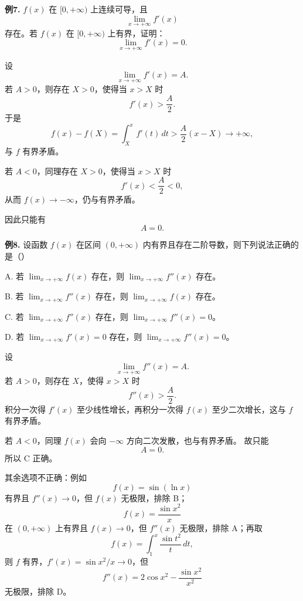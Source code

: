 \begin{problemblock}
\textbf{例7.} \(f(x)\) 在 \([0,+\infty)\) 上连续可导，且
\[
\lim_{x\to+\infty}f'(x)
\]
存在。若 \(f(x)\) 在 \([0,+\infty)\) 上有界，证明：
\[
\lim_{x\to+\infty}f'(x)=0.
\]
\end{problemblock}
\begin{solutionblock}
设
\[
\lim_{x\to+\infty}f'(x)=A.
\]
若 \(A>0\)，则存在 \(X>0\)，使得当 \(x>X\) 时
\[
f'(x)>\frac A2.
\]
于是
\[
f(x)-f(X)=\int_X^x f'(t)\,dt>\frac A2(x-X)\to+\infty,
\]
与 \(f\) 有界矛盾。

若 \(A<0\)，同理存在 \(X>0\)，使得当 \(x>X\) 时
\[
f'(x)<\frac A2<0,
\]
从而 \(f(x)\to-\infty\)，仍与有界矛盾。

因此只能有
\[
A=0.
\]
\end{solutionblock}

\begin{problemblock}
\textbf{例8.} 设函数 \(f(x)\) 在区间 \((0,+\infty)\) 内有界且存在二阶导数，则下列说法正确的是（\quad）

A. 若 \(\displaystyle \lim_{x\to+\infty}f(x)\) 存在，则 \(\displaystyle \lim_{x\to+\infty}f''(x)\) 存在。

B. 若 \(\displaystyle \lim_{x\to+\infty}f''(x)\) 存在，则 \(\displaystyle \lim_{x\to+\infty}f(x)\) 存在。

C. 若 \(\displaystyle \lim_{x\to+\infty}f''(x)\) 存在，则 \(\displaystyle \lim_{x\to+\infty}f''(x)=0\)。

D. 若 \(\displaystyle \lim_{x\to+\infty}f'(x)=0\) 存在，则 \(\displaystyle \lim_{x\to+\infty}f''(x)=0\)。
\end{problemblock}
\begin{solutionblock}
设
\[
\lim_{x\to+\infty}f''(x)=A.
\]
若 \(A>0\)，则存在 \(X\)，使得 \(x>X\) 时
\[
f''(x)>\frac A2.
\]
积分一次得 \(f'(x)\) 至少线性增长，再积分一次得 \(f(x)\) 至少二次增长，这与 \(f\) 有界矛盾。

若 \(A<0\)，同理 \(f(x)\) 会向 \(-\infty\) 方向二次发散，也与有界矛盾。
故只能
\[
A=0.
\]
所以 C 正确。

其余选项不正确：例如
\[
f(x)=\sin(\ln x)
\]
有界且 \(f''(x)\to0\)，但 \(f(x)\) 无极限，排除 B；
\[
f(x)=\frac{\sin x^2}{x}
\]
在 \((0,+\infty)\) 上有界且 \(f(x)\to0\)，但 \(f''(x)\) 无极限，排除 A；再取
\[
f(x)=\int_1^x\frac{\sin t^2}{t}\,dt,
\]
则 \(f\) 有界，\(f'(x)=\sin x^2/x\to0\)，但
\[
f''(x)=2\cos x^2-\frac{\sin x^2}{x^2}
\]
无极限，排除 D。
\end{solutionblock}

